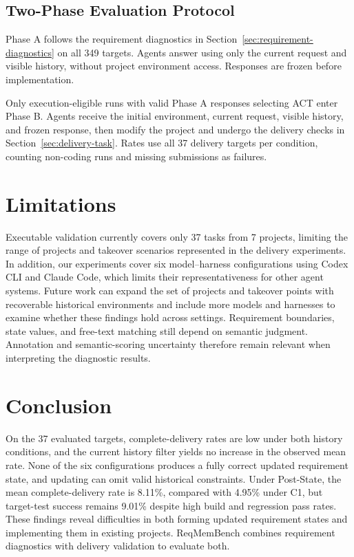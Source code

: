 \documentclass{article} %
\begin{document}
\subsection{Two-Phase Evaluation Protocol}
\label{sec:benchmark-protocol}
\label{sec:takeover-protocol}

Phase A follows the requirement diagnostics in Section~\ref{sec:requirement-diagnostics} on all 349 targets. Agents answer using only the current request and visible history, without project environment access. Responses are frozen before implementation.

Only execution-eligible runs with valid Phase A responses selecting ACT enter Phase B. Agents receive the initial environment, current request, visible history, and frozen response, then modify the project and undergo the delivery checks in Section~\ref{sec:delivery-task}. Rates use all 37 delivery targets per condition, counting non-coding runs and missing submissions as failures.

\section{Limitations}
\label{sec:limitations}

Executable validation currently covers only 37 tasks from 7 projects, limiting the range of projects and takeover scenarios represented in the delivery experiments. In addition, our experiments cover six model--harness configurations using Codex CLI and Claude Code, which limits their representativeness for other agent systems. Future work can expand the set of projects and takeover points with recoverable historical environments and include more models and harnesses to examine whether these findings hold across settings. Requirement boundaries, state values, and free-text matching still depend on semantic judgment. Annotation and semantic-scoring uncertainty therefore remain relevant when interpreting the diagnostic results.

\section{Conclusion}
\label{sec:conclusion}

On the 37 evaluated targets, complete-delivery rates are low under both history conditions, and the current history filter yields no increase in the observed mean rate. None of the six configurations produces a fully correct updated requirement state, and updating can omit valid historical constraints. Under Post-State, the mean complete-delivery rate is 8.11\%, compared with 4.95\% under C1, but target-test success remains 9.01\% despite high build and regression pass rates. These findings reveal difficulties in both forming updated requirement states and implementing them in existing projects. ReqMemBench combines requirement diagnostics with delivery validation to evaluate both.
\end{document}
